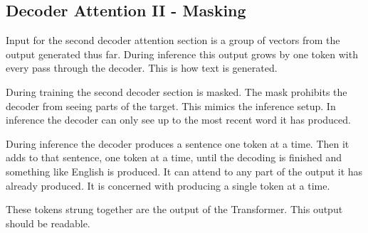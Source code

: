 \subsection{Decoder Attention II - Masking}
Input for the second decoder attention section is a group of vectors from the output generated thus far. During inference this output grows by one token with every pass through the decoder. This is how text is generated.

During training the second decoder section is masked. The mask prohibits the decoder from seeing parts of the target. This mimics the inference setup. In inference the decoder can only see up to the most recent word it has produced.

During inference the decoder produces a sentence one token at a time. Then it adds to that sentence, one token at a time, until the decoding is finished and something like English is produced. It can attend to any part of the output it has already produced. It is concerned with producing a single token at a time.

These tokens strung together are the output of the Transformer. This output should be readable. %

